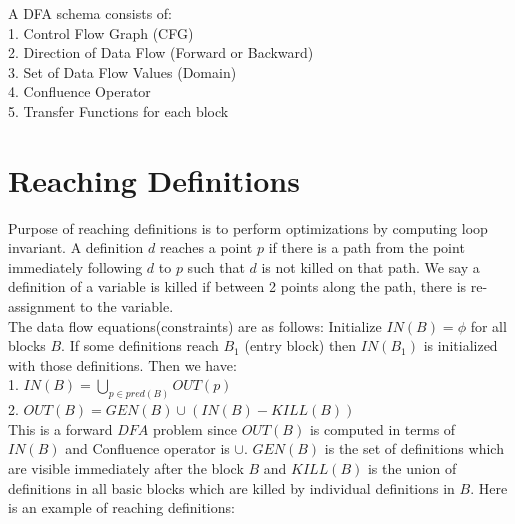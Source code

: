\documentclass{article}
\begin{document}
A DFA schema consists of: \\    
1. Control Flow Graph (CFG) \\
2. Direction of Data Flow (Forward or Backward) \\
3. Set of Data Flow Values (Domain) \\
4. Confluence Operator \\
5. Transfer Functions for each block \\

\section*{Reaching Definitions} 
Purpose of reaching definitions is to perform optimizations by computing loop invariant. A definition $d$ reaches a point $p$ if there is a path from the point immediately following $d$ to $p$ such that $d$ is not killed on that path. We say a definition of a variable is killed if between 2 points along the path, there is re-assignment to the variable. \\

The data flow equations(constraints) are as follows: Initialize $IN(B) = \phi$ for all blocks $B$. If some definitions reach $B_1$ (entry block) then $IN(B_1)$ is initialized with those definitions. Then we have: \\
1. $IN(B) = \bigcup_{p \in pred(B)} OUT(p)$ \\
2. $OUT(B) = GEN(B) \cup (IN(B) - KILL(B))$ \\

This is a forward $DFA$ problem since $OUT(B)$ is computed in terms of $IN(B)$ and Confluence operator is $\cup$. $GEN(B)$ is the set of definitions which are visible immediately after the block $B$ and $KILL(B)$ is the union of  definitions in all basic blocks which are killed by individual definitions in $B$. Here is an example of reaching definitions:
\end{document}
